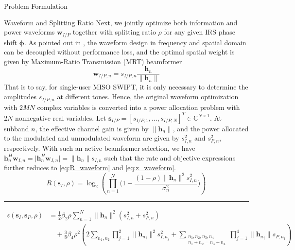 \documentclass[journal]{IEEEtran}
\begin{document}
\begin{section}{Problem Formulation}
		\begin{subsection}{Waveform and Splitting Ratio}
			Next, we jointly optimize both information and power waveforms $\boldsymbol{w}_{I/P}$ together with splitting ratio $\rho$ for any given IRS phase shift $\boldsymbol{\phi}$. As pointed out in \cite{Clerckx2018b}, the waveform design in frequency and spatial domain can be decoupled without performance loss, and the optimal spatial weight is given by Maximum-Ratio Transmission (MRT) beamformer
			\begin{equation}\label{eq:w_IP}
				\boldsymbol{w}_{I/P,n}=s_{I/P,n}\frac{\boldsymbol{h}_n}{\lVert{\boldsymbol{h}_n}\rVert}
			\end{equation}
			That is to say, for single-user MISO SWIPT, it is only necessary to determine the amplitudes $s_{I/P,n}$ at different tones. Hence, the original waveform optimization with $2MN$ complex variables is converted into a power allocation problem with $2N$ nonnegative real variables. Let $\boldsymbol{s}_{I/P}=[s_{I/P,1},\dots,s_{I/P,N}]^T \in \mathbb{C}^{N \times 1}$. At subband $n$, the effective channel gain is given by $\lVert{\boldsymbol{h}_n}\rVert$, and the power allocated to the modulated and unmodulated waveform are given by $s_{I,n}^2$ and $s_{P,n}^2$, respectively. With such an active beamformer selection, we have $\boldsymbol{h}_n^H\boldsymbol{w}_{I,n}=\lvert{\boldsymbol{h}_n^H\boldsymbol{w}_{I,n}}\rvert=\lVert{\boldsymbol{h}_n}\rVert s_{I,n}$ such that the rate and objective expressions further reduces to \ref{eq:R_waveform} and \ref{eq:z_waveform}.
			\begin{equation}\label{eq:R_waveform}
				R(\boldsymbol{s}_I,\rho) = \log_2\left(\prod_{n=1}^N\biggl(1+\frac{(1-\rho)\lVert{\boldsymbol{h}_n}\rVert^2 s_{I,n}^2}{\sigma_n^2}\biggr)\right)
			\end{equation}
			\begin{figure*}[b]
				\hrule
				\begin{equation}\label{eq:z_waveform}
					\begin{split}
						z(\boldsymbol{s}_I,\boldsymbol{s}_P,\rho)
						& = \frac{1}{2}{\beta_2}{\rho} \sum_{n=1}^N \lVert{\boldsymbol{h}_n}\rVert^2(s_{I,n}^2+s_{P,n}^2)\\
						& \quad + \frac{3}{8}{\beta_4}{\rho^2} \left( 2\sum_{n_1,n_2} \prod_{j=1}^2 \lVert{\boldsymbol{h}_{n_j}}\rVert^2 s_{I,{n_j}}^2 + \sum_{\substack{{n_1},{n_2},{n_3},{n_4}\\{n_1}+{n_2}={n_3}+{n_4}}} \prod_{j=1}^4 \lVert{\boldsymbol{h}_{n_j}}\rVert s_{P,{n_j}} \right)\\

\end{split}
\end{equation}
\end{figure*}
\end{subsection}
\end{section}
\end{document}
